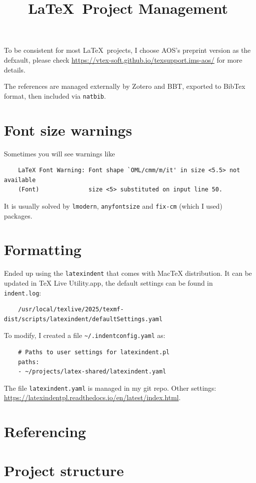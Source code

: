 \documentclass[aos,preprint]{imsart}
\begin{document}
\title{\LaTeX\ Project Management}

To be consistent for most \LaTeX\ projects,
I choose AOS's preprint version as the defxault, please check
\url{https://vtex-soft.github.io/texsupport.ims-aos/} for more details.

The references are managed externally by Zotero and BBT,
exported to BibTex format, then included via \verb|natbib|.

\section{Font size warnings}

Sometimes you will see warnings like
\begin{Verbatim}
	LaTeX Font Warning: Font shape `OML/cmm/m/it' in size <5.5> not available
	(Font)              size <5> substituted on input line 50.
\end{Verbatim}

It is usually solved by \verb|lmodern|, \verb|anyfontsize| and \verb|fix-cm| (which I used) packages.

\section{Formatting}

Ended up using the \verb|latexindent| that comes with MacTeX distribution.
It can be updated in TeX Live Utility.app, the default settings can be found in \verb|indent.log|:
\begin{Verbatim}
	/usr/local/texlive/2025/texmf-dist/scripts/latexindent/defaultSettings.yaml
\end{Verbatim}

To modify, I created a file \verb|~/.indentconfig.yaml| as:
\begin{Verbatim}
	# Paths to user settings for latexindent.pl
	paths:
	- ~/projects/latex-shared/latexindent.yaml
\end{Verbatim}

The file \verb|latexindent.yaml| is managed in my git repo.
Other settings: \url{https://latexindentpl.readthedocs.io/en/latest/index.html}.

\section{Referencing}


\section{Project structure}
\end{document}
